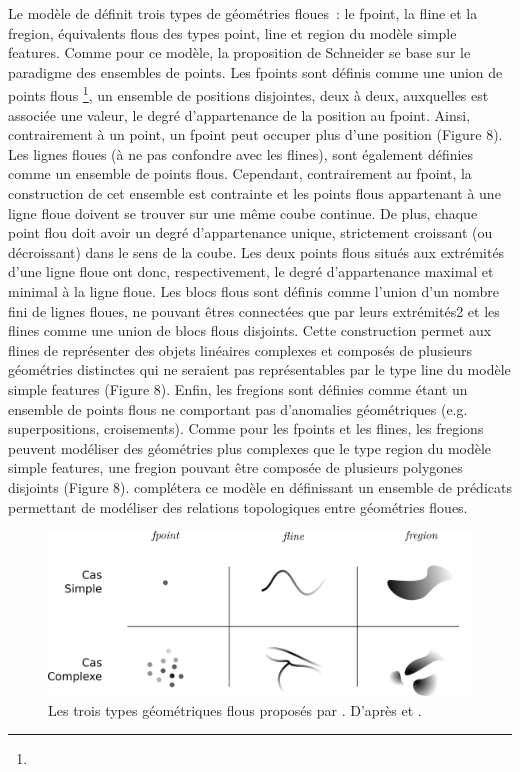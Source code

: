 Le modèle de \textcite{Schneider1999} définit trois types de
géométries floues : le fpoint, la fline et la fregion, équivalents
flous des types point, line et region du modèle simple features. Comme
pour ce modèle, la proposition de Schneider se base sur le paradigme
des ensembles de points. Les fpoints sont définis comme une union de
points flous \footnote{}, \ie un ensemble de positions disjointes,
deux à deux, auxquelles est associée une valeur, le degré
d’appartenance de la position au fpoint. Ainsi, contrairement à un
point, un fpoint peut occuper plus d’une position (Figure 8). Les
lignes floues (à ne pas confondre avec les flines), sont également
définies comme un ensemble de points flous. Cependant, contrairement
au fpoint, la construction de cet ensemble est contrainte et les
points flous appartenant à une ligne floue doivent se trouver sur une
même coube continue. De plus, chaque point flou doit avoir un degré
d’appartenance unique, strictement croissant (ou décroissant) dans le
sens de la coube. Les deux points flous situés aux extrémités d’une
ligne floue ont donc, respectivement, le degré d’appartenance maximal
et minimal à la ligne floue. Les blocs flous sont définis comme
l’union d’un nombre fini de lignes floues, ne pouvant êtres connectées
que par leurs extrémités2 et les flines comme une union de blocs flous
disjoints. Cette construction permet aux flines de représenter des
objets linéaires complexes et composés de plusieurs géométries
distinctes qui ne seraient pas représentables par le type line du
modèle simple features (Figure 8). Enfin, les fregions sont définies
comme étant un ensemble de points flous ne comportant pas d’anomalies
géométriques (e.g. superpositions, croisements). Comme pour les
fpoints et les flines, les fregions peuvent modéliser des géométries
plus complexes que le type region du modèle simple features, une
fregion pouvant être composée de plusieurs polygones disjoints (Figure
8). \textcite{Schneider2004} complétera ce modèle en définissant un
ensemble de prédicats permettant de modéliser des relations
topologiques entre géométries floues.

\begin{figure}
  \centering
  \includegraphics{../figures/fig8.png}
  \caption{Les trois types géométriques flous proposés par
    \textcite{Schneider1999}. D’après \textcite{Schneider1999} et
    \textcite{Bunel2020}.}
  \label{fig:mod_schneider}
\end{figure}

